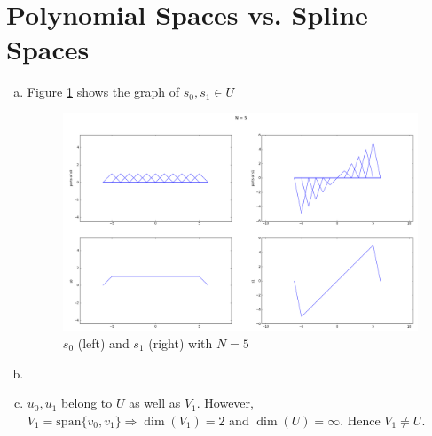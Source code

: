 \section{Polynomial Spaces vs. Spline Spaces}\label{sec:p4}

\begin{enumerate}[(a)]
\item Figure \ref{fig:p4a} shows the graph of $s_0, s_1 \in U$
\begin{figure}[htbp]
	\centering
	\includegraphics[width=\linewidth]{images/p4a}
	\caption{$s_0$ (left) and $s_1$ (right) with $N=5$}
	\label{fig:p4a}
\end{figure}

\item

\item $u_0, u_1$ belong to $U$  as well as $V_1$. However, $V_1 = \mathrm{span}\{v_0, v_1\} \Rightarrow \dim(V_1) = 2$ and $\dim(U) = \infty$. Hence $V_1 \neq U$.
\end{enumerate}